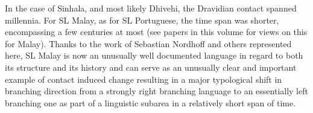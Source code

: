  In the case of Sinhala, and most likely Dhivehi, the Dravidian contact spanned millennia. For SL Malay, as for SL Portuguese, the time span was shorter, encompassing a few centuries at most (see papers in this volume for views on this for Malay). Thanks to the work of Sebastian Nordhoff and others represented here, SL Malay is now an unusually well documented language in regard to both its structure and its history and can serve as an unusually clear and important example of contact induced change resulting in a major typological shift in branching direction from a strongly right branching language to an essentially left branching one as part of a linguistic subarea in a relatively short span of time. 

